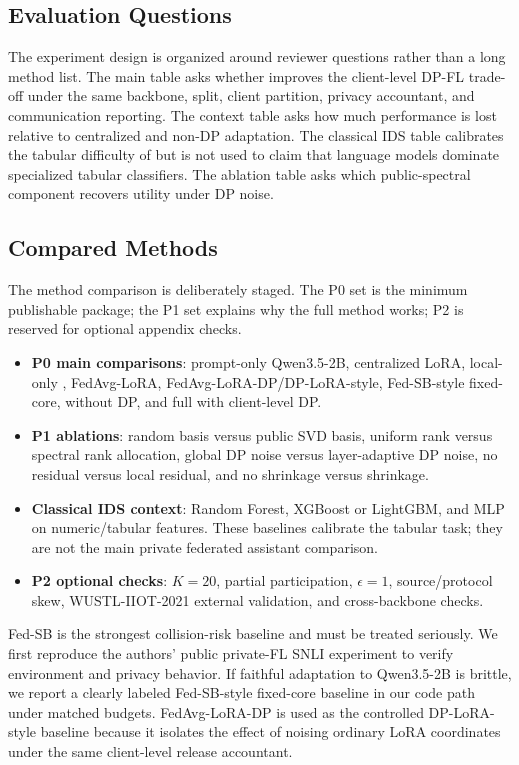 \subsection{Evaluation Questions}
The experiment design is organized around reviewer questions rather than a long method list. The main table asks whether \method{} improves the client-level DP-FL trade-off under the same backbone, split, client partition, privacy accountant, and communication reporting. The context table asks how much performance is lost relative to centralized and non-DP adaptation. The classical IDS table calibrates the tabular difficulty of \dataset but is not used to claim that language models dominate specialized tabular classifiers. The ablation table asks which public-spectral component recovers utility under DP noise.

\subsection{Compared Methods}
The method comparison is deliberately staged. The P0 set is the minimum publishable package; the P1 set explains why the full method works; P2 is reserved for optional appendix checks.
\begin{itemize}[leftmargin=*]
  \item \textbf{P0 main comparisons}: prompt-only Qwen3.5-2B, centralized LoRA, local-only \core{}, FedAvg-LoRA, FedAvg-LoRA-DP/DP-LoRA-style, Fed-SB-style fixed-core, \core{} without DP, and full \method{} with client-level DP.
  \item \textbf{P1 ablations}: random basis versus public SVD basis, uniform rank versus spectral rank allocation, global DP noise versus layer-adaptive DP noise, no residual versus local residual, and no shrinkage versus shrinkage.
  \item \textbf{Classical IDS context}: Random Forest, XGBoost or LightGBM, and MLP on numeric/tabular features. These baselines calibrate the tabular task; they are not the main private federated assistant comparison.
  \item \textbf{P2 optional checks}: $K=20$, partial participation, $\epsilon=1$, source/protocol skew, WUSTL-IIOT-2021 external validation, and cross-backbone checks.
\end{itemize}
Fed-SB is the strongest collision-risk baseline and must be treated seriously. We first reproduce the authors' public private-FL SNLI experiment to verify environment and privacy behavior. If faithful adaptation to Qwen3.5-2B is brittle, we report a clearly labeled Fed-SB-style fixed-core baseline in our code path under matched budgets. FedAvg-LoRA-DP is used as the controlled DP-LoRA-style baseline because it isolates the effect of noising ordinary LoRA coordinates under the same client-level release accountant.

